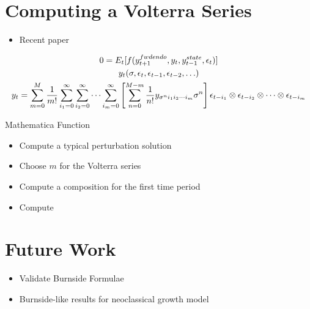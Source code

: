 \documentclass[12pt]{article}
\begin{document}
\section{Computing a Volterra Series}


{

  \begin{itemize}
  \item Recent paper\cite{meyer-gohde10,lan13} 
  \end{itemize}
    \begin{gather*}
0=E_t [ f(y_{t+1}^{fwdendo},y_t,y_{t-1}^{state},\epsilon_t)]\\
y_t(\sigma,\epsilon_{t},\epsilon_{t-1},\epsilon_{t-2},\ldots)\\
      y_t= \sum_{m=0}^M\frac{1}{m!} \sum_{i_1=0}^\infty\sum_{i_2=0}^\infty\cdots\sum_{i_m=0}^\infty\left [ \sum_{n=0}^{M-m} \frac{1}{n!} y_{\sigma^n i_1 i_2\cdots i_m}\sigma^n\right ] \epsilon_{t-i_1}\otimes \epsilon_{t-i_2} \otimes \cdots \otimes \epsilon_{t-i_m}
    \end{gather*}
}


{Mathematica Function}
   \begin{itemize}
   \item Compute a typical perturbation solution
   \item Choose $m$ for the Volterra series
   \item Compute a composition for the first time period
   \item Compute 
   \end{itemize}



\section{Future Work}
\label{sec:future-work}

\begin{itemize}
\item Validate Burnside Formulae
\item Burnside-like results for neoclassical growth model
\end{itemize}


\end{document}
